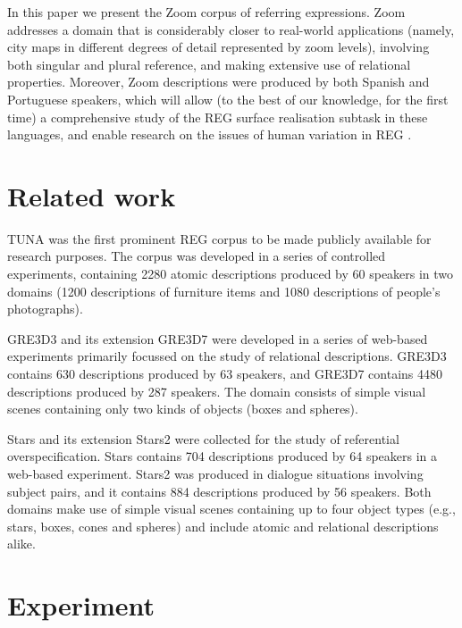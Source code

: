 \documentclass[11pt]{article}
\begin{document}
In this paper we present the Zoom corpus of referring expressions. Zoom addresses a domain that is considerably closer to real-world applications (namely, city maps in different degrees of detail represented by zoom levels), involving both singular and plural reference, and making extensive use of relational properties. Moreover, Zoom descriptions were produced by both Spanish and Portuguese speakers, which will allow (to the best of our knowledge, for the first time) a comprehensive study of the REG surface realisation subtask in these languages, and enable research on the issues of human variation in REG \cite{trainable-speaker,romina-coling,non-det}. 


\section{Related work}
\label{sec-background}

TUNA \cite{tuna-corpus} was the first prominent REG corpus to be made publicly available for research purposes. The corpus was developed in a series of controlled experiments, containing 2280 atomic descriptions produced by 60 speakers in two domains (1200 descriptions of furniture items and 1080 descriptions of people's photographs). 

GRE3D3 and its extension GRE3D7 \cite{gre3d3,gre3d7} were developed in a series of web-based experiments primarily focussed on the study of relational descriptions. GRE3D3 contains 630 descriptions produced by 63 speakers, and GRE3D7 contains 4480 descriptions produced by 287 speakers. The domain consists of simple visual scenes containing only two kinds of objects (boxes and spheres).

Stars \cite{stars-mutual-disamb} and its extension Stars2 were collected for the study of referential overspecification. Stars contains 704 descriptions produced by 64 speakers in a web-based experiment. Stars2 was produced in dialogue situations involving subject pairs, and it contains 884 descriptions produced by 56 speakers. Both domains make use of simple visual scenes containing up to four object types (e.g., stars, boxes, cones and spheres) and include atomic and relational descriptions alike. 


\section{Experiment}
\label{sec-experiment}
\end{document}
